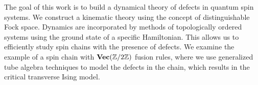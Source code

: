 The goal of this work is to build a dynamical theory of defects in quantum spin systems. We construct a kinematic theory using the concept of distinguishable Fock space. Dynamics are incorporated by methods of topologically ordered systems using the ground state of a specific Hamiltonian. This allows us to efficiently study spin chains with the presence of defects. We examine the example of a spin chain with $\textbf{Vec}(\mathbb{Z}/2\mathbb{Z})$ fusion rules, where we use generalized tube algebra techniques to model the defects in the chain, which results in the critical transverse Ising model.